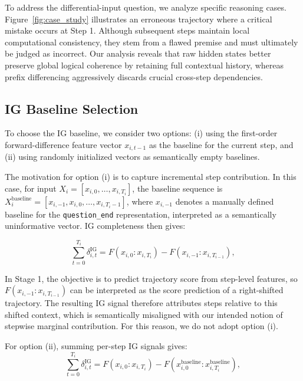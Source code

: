 To address the differential-input question, we analyze specific reasoning cases. Figure~\ref{fig:case_study} %
illustrates an erroneous trajectory where a critical mistake occurs at Step 1. Although subsequent steps maintain local computational consistency, they stem from a flawed premise and must ultimately be judged as incorrect. Our analysis reveals that raw hidden states better preserve global logical coherence by retaining full contextual history, whereas prefix differencing aggressively discards crucial cross-step dependencies.

\subsection{IG Baseline Selection}
\label{ig_baseline_selection}
To choose the IG baseline, we consider two options: (i) using the first-order
forward-difference feature vector \(x_{i,t-1}\) as the baseline for the current
step, and (ii) using randomly initialized vectors as semantically empty
baselines.

The motivation for option (i) is to capture incremental step contribution.
In this case, for input \(X_i=[x_{i,0},\ldots,x_{i,T_i}]\), the baseline
sequence is \(X_{i}^{\mathrm{baseline}}=[x_{i,-1}, x_{i,0}, \ldots, x_{i,T_i-1}]\),
where \(x_{i,-1}\) denotes a manually defined baseline for the
\texttt{question\_end}
representation,
interpreted as a semantically uninformative vector.
IG completeness then gives:

\begin{equation}
\label{eq:baseline_selection_delta}
\sum_{t=0}^{T_i}\delta_{i,t}^{\mathrm{IG}}
=
F(x_{i,0}:x_{i, T_i}) - F(x_{i,-1}:x_{i, T_{i-1}}),
\end{equation}

In Stage 1, the objective is to predict trajectory score from step-level
features, so \(F(x_{i,-1}:x_{i, T_{i-1}})\) can be interpreted as the score
prediction of a right-shifted trajectory.
The resulting IG signal therefore attributes steps relative to this shifted
context, which is semantically misaligned with our intended notion of stepwise
marginal contribution.
For this reason, we do not adopt option (i).

For option (ii), summing per-step IG signals gives:
\begin{equation}
\label{eq:baseline_selection_zero}
\sum_{t=0}^{T_i}\delta_{i,t}^{\mathrm{IG}}
= 
F(x_{i,0}:x_{i, T_i}) - F(x_{i,0}^{\mathrm{baseline}}:x_{i, T_i}^{\mathrm{baseline}}),
\end{equation}

